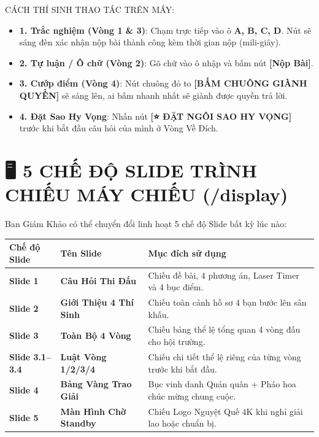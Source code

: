 \documentclass[11pt,a4paper]{article}
\begin{document}
\begin{stepbox}{CÁCH THÍ SINH THAO TÁC TRÊN MÁY:}
\begin{itemize}[leftmargin=*]
    \item \textbf{1. Trắc nghiệm (Vòng 1 \& 3)}: Chạm trực tiếp vào ô \textbf{A, B, C, D}. Nút sẽ sáng đèn xác nhận nộp bài thành công kèm thời gian nộp (mili-giây).
    \item \textbf{2. Tự luận / Ô chữ (Vòng 2)}: Gõ chữ vào ô nhập và bấm nút \textbf{[Nộp Bài]}.
    \item \textbf{3. Cướp điểm (Vòng 4)}: Nút chuông đỏ to \textbf{[BẤM CHUÔNG GIÀNH QUYỀN]} sẽ sáng lên, ai bấm nhanh nhất sẽ giành được quyền trả lời.
    \item \textbf{4. Đặt Sao Hy Vọng}: Nhấn nút \textbf{[⭐ ĐẶT NGÔI SAO HY VỌNG]} trước khi bắt đầu câu hỏi của mình ở Vòng Về Đích.
\end{itemize}
\end{stepbox}

\vspace{0.5cm}

\section*{\color{navybg}🖥️ 5 CHẾ ĐỘ SLIDE TRÌNH CHIẾU MÁY CHIẾU (/display)}

Ban Giám Khảo có thể chuyển đổi linh hoạt 5 chế độ Slide bất kỳ lúc nào:

\begin{table}[h!]
\centering
\small
\begin{tabularx}{\textwidth}{l l X}
\toprule
\textbf{Chế độ Slide} & \textbf{Tên Slide} & \textbf{Mục đích sử dụng} \\
\midrule
\textbf{Slide 1} & \textbf{Câu Hỏi Thi Đấu} & Chiếu đề bài, 4 phương án, Laser Timer và 4 bục điểm. \\
\textbf{Slide 2} & \textbf{Giới Thiệu 4 Thí Sinh} & Chiếu toàn cảnh hồ sơ 4 bạn bước lên sân khấu. \\
\textbf{Slide 3} & \textbf{Toàn Bộ 4 Vòng} & Chiếu bảng thể lệ tổng quan 4 vòng đấu cho hội trường. \\
\textbf{Slide 3.1--3.4} & \textbf{Luật Vòng 1/2/3/4} & Chiếu chi tiết thể lệ riêng của từng vòng trước khi bắt đầu. \\
\textbf{Slide 4} & \textbf{Bảng Vàng Trao Giải} & Bục vinh danh Quán quân + Pháo hoa chúc mừng chung cuộc. \\
\textbf{Slide 5} & \textbf{Màn Hình Chờ Standby} & Chiếu Logo Nguyệt Quế 4K khi nghỉ giải lao hoặc chuẩn bị. \\
\bottomrule
\end{tabularx}
\end{table}
\end{document}

